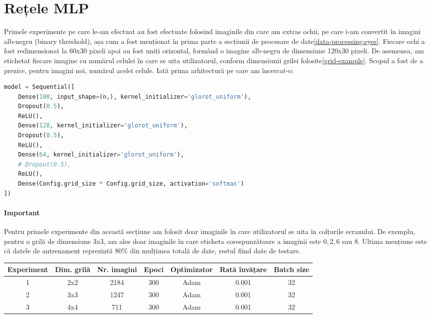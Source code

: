 \section{Rețele MLP}

Primele experimente pe care le-am efectuat au fost efectuate folosind imaginile din care am extras ochii, pe care i-am convertit în imagini alb-negru (binary threshold), așa cum a fost menționat în prima parte a secțiunii de procesare de date\ref{data-processing:eyes}.
Fiecare ochi a fost redimensionat la 60x30 pixeli apoi au fost uniți orizontal, formând o imagine alb-negru de dimensiune 120x30 pixeli.
De asemenea, am etichetat fiecare imagine cu numărul celulei în care se uita utilizatorul, conform dimensiunii grilei folosite\ref{grid-example}.
Scopul a fost de a prezice, pentru imagini noi, numărul acelei celule.
Iată prima arhitectură pe care am încercat-o:

\begin{lstlisting}[language=Python, caption=MLP 1]
model = Sequential([
    Dense(100, input_shape=(n,), kernel_initializer='glorot_uniform'),
    Dropout(0.5),
    ReLU(),
    Dense(128, kernel_initializer='glorot_uniform'),
    Dropout(0.5),
    ReLU(),
    Dense(64, kernel_initializer='glorot_uniform'),
    # Dropout(0.5),
    ReLU(),
    Dense(Config.grid_size * Config.grid_size, activation='softmax')
])
\end{lstlisting}

\paragraph{Important}
Pentru primele experimente din această secțiune am folosit doar imaginile în care utilizatorul se uita în colțurile ecranului.
De exemplu, pentru o grilă de dimensiune 3x3, am ales doar imaginile în care eticheta corespunzătoare a imaginii este $0, 2, 6$ sau $8$.
Ultima mențiune este că datele de antrenament reprezintă $80\%$ din mulțimea totală de date, restul fiind date de testare.

\begin{center}
    \begin{tabular}{ c | c | c | c | c | c | c }
        \hline
        Experiment & Dim. grilă & Nr. imagini & Epoci & Optimizator & Rată învățare & Batch size \\ 
        \hline
        1 & 2x2 & 2184 & 300 & Adam & 0.001 & 32 \\
        \hline
        2 & 3x3 & 1247 & 300 & Adam & 0.001 & 32 \\
        \hline
        3 & 4x4 & 711 & 300 & Adam & 0.001 & 32 \\
        \hline
    \end{tabular}
\end{center}



